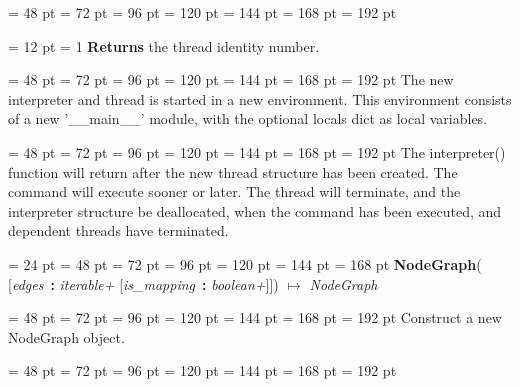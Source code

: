 {{{{{{{\par}
\par}
\par}
\par}
{\par \noindent  \leftskip = 48 pt  \leftmargini = 72 pt  \leftmarginii = 96 pt  \leftmarginiii = 120 pt  \leftmarginiv = 144 pt  \leftmarginv = 168 pt  \leftmarginvi = 192 pt {\par \noindent
{\par \pagebreak[3.100000] \noindent \hangindent = 12 pt \hangafter = 1 
{\bf Returns \/} the thread identity number.\par}
\par}
\par}
{\par \noindent  \leftskip = 48 pt  \leftmargini = 72 pt  \leftmarginii = 96 pt  \leftmarginiii = 120 pt  \leftmarginiv = 144 pt  \leftmarginv = 168 pt  \leftmarginvi = 192 pt The new interpreter and thread is started in a new environment.  This
environment consists of a new '{\_}{\_}main{\_}{\_}' module, with the optional
locals dict as local variables.\par}
{\par \noindent  \leftskip = 48 pt  \leftmargini = 72 pt  \leftmarginii = 96 pt  \leftmarginiii = 120 pt  \leftmarginiv = 144 pt  \leftmarginv = 168 pt  \leftmarginvi = 192 pt The interpreter() function will return after the new thread structure
has been created. The command will execute sooner or later.  The
thread will terminate, and the interpreter structure be deallocated,
when the command has been executed, and dependent threads have
terminated.
\par}
\par}
\par}
{\par \noindent  \leftskip = 24 pt  \leftmargini = 48 pt  \leftmarginii = 72 pt  \leftmarginiii = 96 pt  \leftmarginiv = 120 pt  \leftmarginv = 144 pt  \leftmarginvi = 168 pt {\bf {\large {\bf NodeGraph\/}}\/}( {[}{\em edges\/}~{\bf :}  {\em iterable+\/}  {[}{\em is{\_}mapping\/}~{\bf :}  {\em boolean+\/}]]) \(\mapsto \)  {\em NodeGraph\/}{\par \noindent
{\par \noindent  \leftskip = 48 pt  \leftmargini = 72 pt  \leftmarginii = 96 pt  \leftmarginiii = 120 pt  \leftmarginiv = 144 pt  \leftmarginv = 168 pt  \leftmarginvi = 192 pt  Construct a new NodeGraph object.\par}
{\par \noindent  \leftskip = 48 pt  \leftmargini = 72 pt  \leftmarginii = 96 pt  \leftmarginiii = 120 pt  \leftmarginiv = 144 pt  \leftmarginv = 168 pt  \leftmarginvi = 192 pt {\par \noindent
}}}}}
